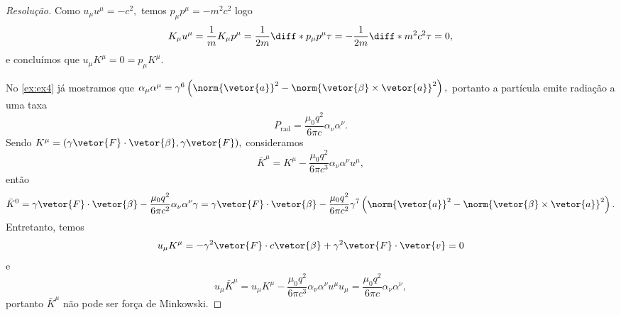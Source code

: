 \begin{proof}[Resolução]
   Como \(u_\mu u^\mu = -c^2,\) temos \(p_\mu p^\mu = -m^2c^2\) logo
   \begin{equation*}
      K_\mu u^\mu = \frac1m K_\mu p^\mu = \frac1{2m} \diff*{p_\mu p^\mu}{\tau} = - \frac1{2m} \diff*{m^2 c^2}{\tau} = 0,
   \end{equation*}
   e concluímos que \(u_\mu K^\mu = 0 = p_\mu K^\mu.\)

   No \cref{ex:ex4} já mostramos que \(\alpha_\mu \alpha^\mu = \gamma^6 \left(\norm{\vetor{a}}^2 - \norm{\vetor{\beta}\times \vetor{a}}^2\right),\) portanto a partícula emite radiação a uma taxa
   \begin{equation*}
      P_\mathrm{rad} = \frac{\mu_0 q^2}{6\pi c} \alpha_\nu \alpha^\nu.
   \end{equation*}
   Sendo \(K^\mu = (\gamma \vetor{F}\cdot \vetor{\beta}, \gamma \vetor{F}),\) consideramos
   \begin{equation*}
      \bar{K}^\mu = K^\mu - \frac{\mu_0 q^2}{6\pi c^3} \alpha_\nu \alpha^\nu u^\mu,
   \end{equation*}
   então
   \begin{equation*}
      \bar{K}^0 = \gamma \vetor{F} \cdot \vetor{\beta} - \frac{\mu_0 q^2}{6\pi c^2} \alpha_\nu \alpha^\nu \gamma = \gamma \vetor{F} \cdot \vetor{\beta} - \frac{\mu_0 q^2}{6\pi c^2} \gamma^7 \left(\norm{\vetor{a}}^2 - \norm{\vetor{\beta} \times \vetor{a}}^2\right).
   \end{equation*}
   Entretanto, temos
   \begin{equation*}
      u_\mu K^\mu = -\gamma^2 \vetor{F} \cdot c\vetor{\beta}  + \gamma^2 \vetor{F} \cdot \vetor{v} = 0
   \end{equation*}
   e
   \begin{equation*}
      u_\mu \bar{K}^\mu = u_\mu K^\mu - \frac{\mu_0 q^2}{6\pi c^3} \alpha_\nu \alpha^\nu u^\mu u_\mu = \frac{\mu_0 q^2}{6\pi c} \alpha_\nu \alpha^\nu,
   \end{equation*}
   portanto \(\bar{K}^\mu\) não pode ser força de Minkowski. 


\end{proof}

